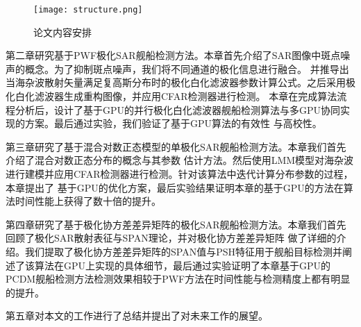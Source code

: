   \begin{figure}[H] %
    \centering
    \texttt{[image: structure.png]}
    \caption{论文内容安排}
    \label{fig:chap1:structure}
  \end{figure}

  第二章研究基于PWF极化SAR舰船检测方法。本章首先介绍了SAR图像中斑点噪声的概念。为了抑制斑点噪声，我们将不同通道的极化信息进行融合。
  并推导出当海杂波散射矢量满足复高斯分布时的极化白化滤波器参数计算公式。之后采用极化白化滤波器生成重构图像，并应用CFAR检测器进行检测。
  本章在完成算法流程分析后，设计了基于GPU的并行极化白化滤波器舰船检测算法与多GPU协同实现的方案。最后通过实验，我们验证了基于GPU算法的有效性
  与高校性。

  第三章研究了基于混合对数正态模型的单极化SAR舰船检测方法。本章我们首先介绍了混合对数正态分布的概念与其参数
  估计方法。然后使用LMM模型对海杂波进行建模并应用CFAR检测器进行检测。针对该算法中迭代计算分布参数的过程，本章提出了
  基于GPU的优化方案，最后实验结果证明本章的基于GPU的方法在算法时间性能上获得了数十倍的提升。

  第四章研究了基于极化协方差差异矩阵的极化SAR舰船检测方法。本章我们首先回顾了极化SAR散射表征与SPAN理论，并对极化协方差差异矩阵
  做了详细的介绍。我们提取了极化协方差差异矩阵的SPAN值与PSH特征用于舰船目标检测并阐述了该算法在GPU上实现的具体细节，最后通过实验证明了本章基于GPU的
  PCDM舰船检测方法检测效果相较于PWF方法在时间性能与检测精度上都有明显的提升。

  第五章对本文的工作进行了总结并提出了对未来工作的展望。